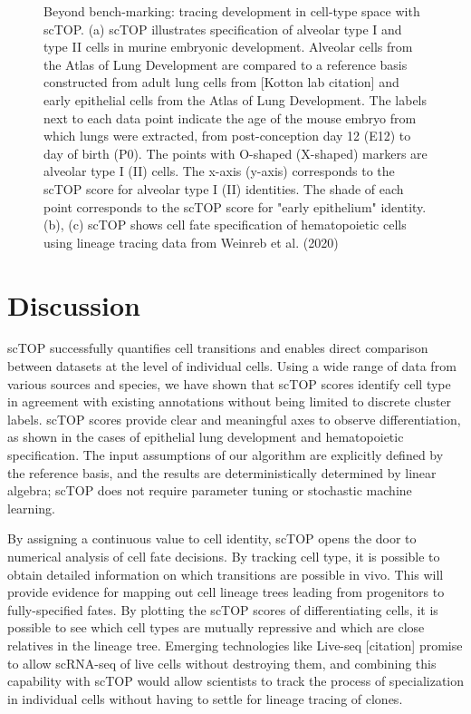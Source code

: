 \documentclass[aps,superscriptaddress, notitlepage,longbibliography]{revtex4-1}
\begin{document}
\begin{figure}
	\caption{Beyond bench-marking: tracing development in cell-type space with scTOP. (a) scTOP illustrates specification of alveolar type I and type II cells in murine embryonic development. Alveolar cells from the Atlas of Lung Development are compared to a reference basis constructed from adult lung cells from [Kotton lab citation] and early epithelial cells from the Atlas of Lung Development. The labels next to each data point indicate the age of the mouse embryo from which lungs were extracted, from post-conception day 12 (E12) to day of birth (P0). The points with O-shaped (X-shaped) markers are alveolar type I (II) cells. The x-axis (y-axis) corresponds to the scTOP score for alveolar type I (II) identities. The shade of each point corresponds to the scTOP score for "early epithelium" identity. (b), (c) scTOP shows cell fate specification of hematopoietic cells using lineage tracing data from Weinreb et al. (2020)}
	\label{FIG:4}
\end{figure}


\section{Discussion}

scTOP successfully quantifies cell transitions and enables direct comparison between datasets at the level of individual cells. Using a wide range of data from various sources and species, we have shown that scTOP scores identify cell type in agreement with existing annotations without being limited to discrete cluster labels. scTOP scores provide clear and meaningful axes to observe differentiation, as shown in the cases of epithelial lung development and hematopoietic specification. The input assumptions of our algorithm are explicitly defined by the reference basis, and the results are deterministically determined by linear algebra; scTOP does not require parameter tuning or stochastic machine learning. 

By assigning a continuous value to cell identity, scTOP opens the door to numerical analysis of cell fate decisions. By tracking cell type, it is possible to obtain detailed information on which transitions are possible in vivo. This will provide evidence for mapping out cell lineage trees leading from progenitors to fully-specified fates. By plotting the scTOP scores of differentiating cells, it is possible to see which cell types are mutually repressive and which are close relatives in the lineage tree. Emerging technologies like Live-seq [citation] promise to allow scRNA-seq of live cells without destroying them, and combining this capability with scTOP would allow scientists to track the process of specialization in individual cells without having to settle for lineage tracing of clones.
\end{document}
